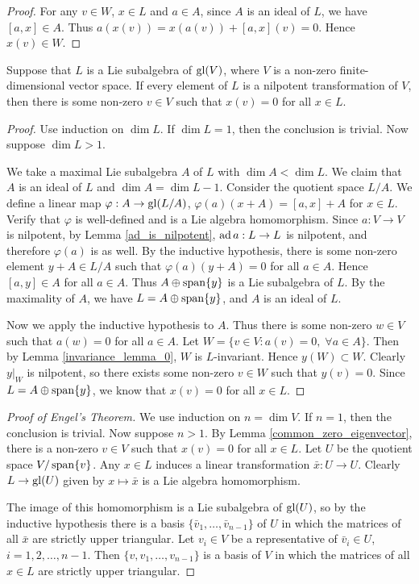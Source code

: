 \begin{proof}
    For any $v\in W$, $x\in L$ and $a\in A$, since $A$ is an ideal of $L$, we have $[a,x]\in A$. Thus $a(x(v))=x(a(v))+[a,x](v)=0$. Hence $x(v)\in W$.
\end{proof}

\begin{lem}\label{common_zero_eigenvector}
    Suppose that $L$ is a Lie subalgebra of $\mathrm{gl}(V)$, where $V$ is a non-zero finite-dimensional vector space. If every element of $L$ is a nilpotent transformation of $V$, then there is some non-zero $v\in V$ such that $x(v)=0$ for all $x\in L$.
\end{lem}

\begin{proof}
    Use induction on $\dim L$. If $\dim L=1$, then the conclusion is trivial. Now suppose $\dim L>1$. 
    
    We take a maximal Lie subalgebra $A$ of $L$ with $\dim A<\dim L$. We claim that $A$ is an ideal of $L$ and $\dim A=\dim L-1$. Consider the quotient space $L/A$. We define a linear map $\varphi:A\to \mathrm{gl}(L/A)$, $ \varphi(a)(x+A)=[a,x]+A$ for $x\in L$. Verify that $\varphi$ is well-defined and is a Lie algebra homomorphism. Since $a:V\to V$ is nilpotent, by Lemma \ref{ad_is_nilpotent}, $\operatorname{ad} a:L\to L$ is nilpotent, and therefore $\varphi(a)$ is as well. By the inductive hypothesis, there is some non-zero element $y+A\in L/A$ such that $\varphi(a)(y+A)=0$ for all $a\in A$. Hence $[a,y]\in A$ for all $a\in A$. Thus $A\oplus \operatorname{span}\{y\}$ is a Lie subalgebra of $L$. By the maximality of $A$, we have $L=A\oplus\operatorname{span}\{y\}$, and $A$ is an ideal of $L$.

    Now we apply the inductive hypothesis to $A$. Thus there is some non-zero $w\in V$ such that $a(w)=0$ for all $a\in A$. Let $W=\{v\in V:a(v)=0,\;\forall a\in A\}$. Then by Lemma \ref{invariance_lemma_0}, $W$ is $L$-invariant. Hence $y(W)\subset W$. Clearly $y|_W$ is nilpotent, so there exists some non-zero $v\in W$ such that $y(v)=0$. Since $L=A\oplus\operatorname{span}\{y\}$, we know that $x(v)=0$ for all $x\in L$.
\end{proof}

\begin{proof}[Proof of Engel's Theorem]
    We use induction on $n=\dim V$. If $n=1$, then the conclusion is trivial. Now suppose $n>1$. By Lemma \ref{common_zero_eigenvector}, there is a non-zero $v\in V$ such that $x(v)=0$ for all $x\in L$. Let $U$ be the quotient space $V/\operatorname{span}\{v\}$. Any $x\in L$ induces a linear transformation $\bar{x}:U\to U$. Clearly $L\to \mathrm{gl}(U)$ given by $x\mapsto \bar{x}$ is a Lie algebra homomorphism. 

    The image of this homomorphism is a Lie subalgebra of $\mathrm{gl}(U)$, so by the inductive hypothesis there is a basis $\{\bar{v}_1,\ldots,\bar{v}_{n-1}\}$ of $U$ in which the matrices of all $\bar{x}$ are strictly upper triangular. Let $v_i\in V$ be a representative of $\bar{v}_i\in U$, $i=1,2,\ldots,n-1$. Then $\{v,v_1,\ldots,v_{n-1}\}$ is a basis of $V$ in which the matrices of all $x\in L$ are strictly upper triangular.
\end{proof}

